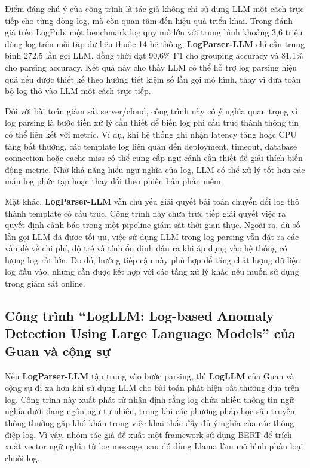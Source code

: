 Điểm đáng chú ý của công trình là tác giả không chỉ sử dụng LLM một cách trực tiếp cho từng dòng log, mà còn quan tâm đến hiệu quả triển khai. Trong đánh giá trên LogPub, một benchmark log quy mô lớn với trung bình khoảng 3,6 triệu dòng log trên mỗi tập dữ liệu thuộc 14 hệ thống, \textbf{LogParser-LLM} chỉ cần trung bình 272,5 lần gọi LLM, đồng thời đạt 90,6\% F1 cho grouping accuracy và 81,1\% cho parsing accuracy. Kết quả này cho thấy LLM có thể hỗ trợ log parsing hiệu quả nếu được thiết kế theo hướng tiết kiệm số lần gọi mô hình, thay vì đưa toàn bộ log thô vào LLM một cách trực tiếp.

Đối với bài toán giám sát server/cloud, công trình này có ý nghĩa quan trọng vì log parsing là bước tiền xử lý cần thiết để biến log phi cấu trúc thành thông tin có thể liên kết với metric. Ví dụ, khi hệ thống ghi nhận latency tăng hoặc CPU tăng bất thường, các template log liên quan đến deployment, timeout, database connection hoặc cache miss có thể cung cấp ngữ cảnh cần thiết để giải thích biến động metric. Nhờ khả năng hiểu ngữ nghĩa của log, LLM có thể xử lý tốt hơn các mẫu log phức tạp hoặc thay đổi theo phiên bản phần mềm.

Mặt khác, \textbf{LogParser-LLM} vẫn chủ yếu giải quyết bài toán chuyển đổi log thô thành template có cấu trúc. Công trình này chưa trực tiếp giải quyết việc ra quyết định cảnh báo trong một pipeline giám sát thời gian thực. Ngoài ra, dù số lần gọi LLM đã được tối ưu, việc sử dụng LLM trong log parsing vẫn đặt ra các vấn đề về chi phí, độ trễ và tính ổn định đầu ra khi áp dụng vào hệ thống có lượng log rất lớn. Do đó, hướng tiếp cận này phù hợp để tăng chất lượng dữ liệu log đầu vào, nhưng cần được kết hợp với các tầng xử lý khác nếu muốn sử dụng trong giám sát online.

\subsection*{Công trình “LogLLM: Log-based Anomaly Detection Using Large Language Models” của Guan và cộng sự}

Nếu \textbf{LogParser-LLM} tập trung vào bước parsing, thì \textbf{LogLLM} của Guan và cộng sự đi xa hơn khi sử dụng LLM cho bài toán phát hiện bất thường dựa trên log. Công trình này xuất phát từ nhận định rằng log chứa nhiều thông tin ngữ nghĩa dưới dạng ngôn ngữ tự nhiên, trong khi các phương pháp học sâu truyền thống thường gặp khó khăn trong việc khai thác đầy đủ ý nghĩa của các thông điệp log. Vì vậy, nhóm tác giả đề xuất một framework sử dụng BERT để trích xuất vector ngữ nghĩa từ log message, sau đó dùng Llama làm mô hình phân loại chuỗi log.

